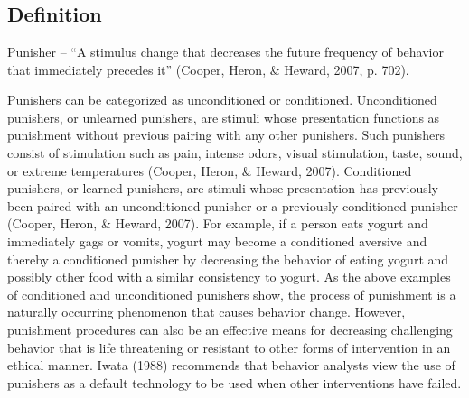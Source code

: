 \clearpage \section{\fourdFifteen{}}
\subsection{Definition}
Punisher – ``A stimulus change that decreases the future frequency of behavior that immediately precedes it'' (Cooper, Heron, \& Heward, 2007, p. 702).  

Punishers can be categorized as unconditioned or conditioned. Unconditioned punishers, or unlearned punishers, are stimuli whose presentation functions as punishment without previous pairing with any other punishers. Such punishers consist of stimulation such as pain, intense odors, visual stimulation, taste, sound, or extreme temperatures (Cooper, Heron, \& Heward, 2007).  Conditioned punishers, or learned punishers, are stimuli whose presentation has previously been paired with an unconditioned punisher or a previously conditioned punisher (Cooper, Heron, \& Heward, 2007).   For example, if a person eats yogurt and immediately gags or vomits, yogurt may become a conditioned aversive and thereby a conditioned punisher by decreasing the behavior of eating yogurt and possibly other food with a similar consistency to yogurt.  As the above examples of conditioned and unconditioned punishers show, the process of punishment is a naturally occurring phenomenon that causes behavior change.  However, punishment procedures can also be an effective means for decreasing challenging behavior that is life threatening or resistant to other forms of intervention in an ethical manner.  Iwata (1988) recommends that behavior analysts view the use of punishers as a default technology to be used when other interventions have failed.  

